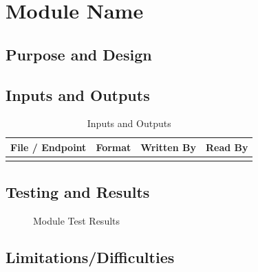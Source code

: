 \section{Module Name}

\subsection{Purpose and Design}

\subsection{Inputs and Outputs}

\begin{table}[htbp]
    \centering
    \begin{tabular}{llll}
        \toprule
        File / Endpoint & Format & Written By & Read By \\
        \midrule
         & & & \\
        \bottomrule
    \end{tabular}
    \caption{Inputs and Outputs}
    \label{tab:inputs_outputs}
\end{table}

\subsection{Testing and Results}

\begin{figure}[htbp]
    \centering
    \caption{Module Test Results}
    \label{fig:results}
\end{figure}

\subsection{Limitations/Difficulties}
